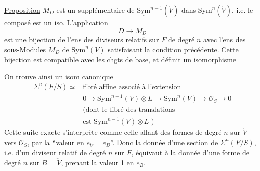 \uline{Proposition} $M_D$ est un supplémentaire de
$\underline{\mathrm{Sym}}^{n-1}(\check V)$ dans $\mathrm{Sym}^n(\check V)$, i.e. le composé
est un iso. L'application
\[
D\longrightarrow M_D
\]
est une bijection de l'ens des diviseurs
relatifs sur $F$ de degré $n$ avec l'ens
des sous-Modules $M_D$ de $\mathrm{Sym}^n(V)$
satisfaisant la condition précédente. Cette
bijection est compatible avec les chgts de
base, et définit un isomorphisme

On trouve ainsi un isom canonique
\[
\begin{aligned}
\Sigma^n(F/S)\simeq{}&\text{fibré affine associé à l'extension}\\
&0\longrightarrow\mathrm{Sym}^{n-1}(V)\otimes L\longrightarrow\mathrm{Sym}^n(V)\longrightarrow\mathcal O_S\longrightarrow0\\
&\text{(dont le fibré des translations}\\
&\text{est }\mathrm{Sym}^{n-1}(V)\otimes L\text{ )}
\end{aligned}\tag*{(62)}
\]
Cette suite exacte s'interprète comme celle
 allant des formes de degré $n$ sur $\check V$  vers $\mathcal O_S$,
par la ``valeur en $e_{\check V}=e_B$''. Donc la donnée
d'une section de $\Sigma^n(F/S)$, i.e. d'un
diviseur relatif de degré $n$ sur $F$, équivaut
à la donnée d'une forme de degré $n$ sur
$B=\check V$, prenant la valeur 1 en $e_B$.

